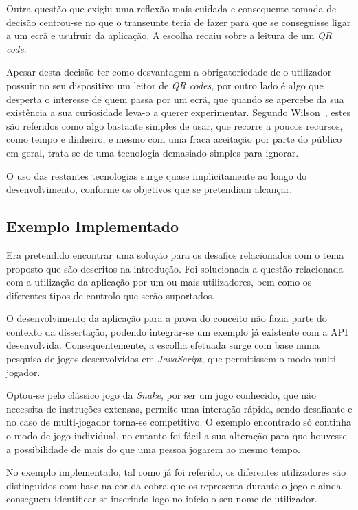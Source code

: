 Outra questão que exigiu uma reflexão mais cuidada e consequente tomada de decisão centrou-se no que o transeunte teria de fazer para que se conseguisse ligar a um ecrã e usufruir da aplicação. A escolha recaiu sobre a leitura de um \textit{QR code}. 

Apesar desta decisão ter como desvantagem a obrigatoriedade de o utilizador possuir no seu dispositivo um leitor de \textit{QR codes}, por outro lado é algo que desperta o interesse de quem passa por um ecrã, que quando se apercebe da sua existência a sua curiosidade leva-o a querer experimentar. Segundo Wilson~\cite{Wilson2014}, estes são referidos como algo bastante simples de usar, que recorre a poucos recursos, como tempo e dinheiro, e mesmo com uma fraca aceitação por parte do público em geral, trata-se de uma tecnologia demasiado simples para ignorar.

O uso das restantes tecnologias surge quase implicitamente ao longo do desenvolvimento, conforme os objetivos que se pretendiam alcançar.

\subsection*{Exemplo Implementado}

Era pretendido encontrar uma solução para os desafios relacionados com o tema proposto que são descritos na introdução. Foi solucionada a questão relacionada com a utilização da aplicação por um ou mais utilizadores, bem como os diferentes tipos de controlo que serão suportados.

O desenvolvimento da aplicação para a prova do conceito não fazia parte do contexto da dissertação, podendo integrar-se um exemplo já existente com a API desenvolvida. Consequentemente, a escolha efetuada surge com base numa pesquisa de jogos desenvolvidos em \textit{JavaScript}, que permitissem o modo multi-jogador. 

Optou-se pelo clássico jogo da \textit{Snake}, por ser um jogo conhecido, que não necessita de instruções extensas, permite uma interação rápida, sendo desafiante e no caso de multi-jogador torna-se competitivo. O exemplo encontrado só continha o modo de jogo individual, no entanto foi fácil a sua alteração para que houvesse a possibilidade de mais do que uma pessoa jogarem ao mesmo tempo.

No exemplo implementado, tal como já foi referido, os diferentes utilizadores são distinguidos com base na cor da cobra que os representa durante o jogo e ainda conseguem identificar-se inserindo logo no início o seu nome de utilizador. 


